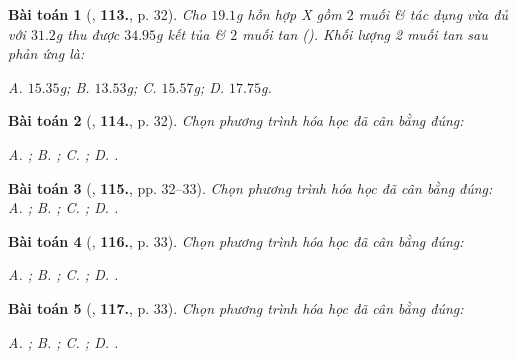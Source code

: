 \documentclass{article}
\numberwithin{equation}{section}
\newtheorem{baitoan}{Bài toán}
\begin{document}
\begin{baitoan}[\cite{An2011}, \textbf{113.}, p. 32]
	Cho $19.1$g hỗn hợp X gồm $2$ muối  \&  tác dụng vừa đủ với $31.2$g  thu được $34.95$g kết tủa  \& $2$ muối tan (). Khối lượng 2 muối tan sau phản ứng là:
	
		{\sf A.} $15.35$g;
		{\sf B.} $13.53$g;
		{\sf C.} $15.57$g;
		{\sf D.} $17.75$g.
	
\end{baitoan}

\begin{baitoan}[\cite{An2011}, \textbf{114.}, p. 32]
	Chọn phương trình hóa học đã cân bằng đúng:
	
		{\sf A.} \emph{};
		{\sf B.} \emph{};
		{\sf C.} \emph{};
		{\sf D.} \emph{}.
	
\end{baitoan}

\begin{baitoan}[\cite{An2011}, \textbf{115.}, pp. 32--33]
	Chọn phương trình hóa học đã cân bằng đúng:\\
	
		{\sf A.} \emph{};
		{\sf B.} \emph{};
		{\sf C.} \emph{};
		{\sf D.} \emph{}.
	
\end{baitoan}

\begin{baitoan}[\cite{An2011}, \textbf{116.}, p. 33]
	Chọn phương trình hóa học đã cân bằng đúng:
	
		{\sf A.} \emph{};
		{\sf B.} \emph{};
		{\sf C.} \emph{};
		{\sf D.} \emph{}.
	
\end{baitoan}

\begin{baitoan}[\cite{An2011}, \textbf{117.}, p. 33]
	Chọn phương trình hóa học đã cân bằng đúng:
	
		{\sf A.} \emph{};
		{\sf B.} \emph{};
		{\sf C.} \emph{};
		{\sf D.} \emph{}.
	
\end{baitoan}
\end{document}
